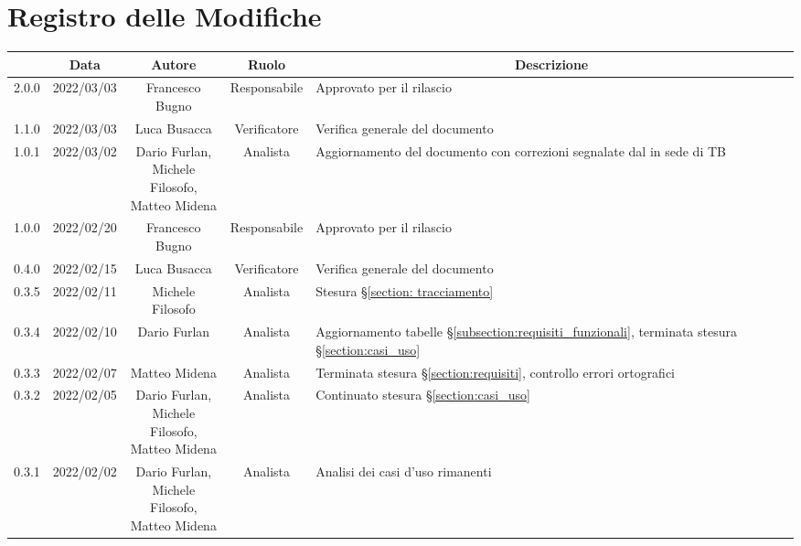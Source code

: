 \thispagestyle{empty}
\section*{Registro delle Modifiche}
\begin{center}
	\renewcommand{\arraystretch}{1.8}
	\begin{longtable}[c]{c | c | c | c | p{5cm}}
		\rowcolor[HTML]{125E28}
		\multicolumn{1}{c}{\color[HTML]{FFFFFF} \textbf{Versione}} &
		\multicolumn{1}{c}{\color[HTML]{FFFFFF} \textbf{Data}}     &
		\multicolumn{1}{c}{\color[HTML]{FFFFFF} \textbf{Autore}}   &
		\multicolumn{1}{c}{\color[HTML]{FFFFFF} \textbf{Ruolo}}    &
		\multicolumn{1}{c}{\color[HTML]{FFFFFF} \textbf{Descrizione}} \\
		\endhead
		2.0.0 & 2022/03/03 & Francesco Bugno & Responsabile & Approvato per il rilascio\\
		1.1.0 & 2022/03/03 & Luca Busacca & Verificatore & Verifica generale del documento\\
		1.0.1 & 2022/03/02 & \Shortunderstack{Dario Furlan,\\Michele Filosofo,\\Matteo Midena} & Analista & Aggiornamento del documento con correzioni segnalate dal \commitNameS{} in sede di TB \\
		1.0.0 & 2022/02/20 & Francesco Bugno & Responsabile & Approvato per il rilascio\\
		0.4.0 & 2022/02/15 & Luca Busacca & Verificatore & Verifica generale del documento\\
		0.3.5 & 2022/02/11 & Michele Filosofo & Analista & Stesura §\ref{section: tracciamento}\\
		0.3.4 & 2022/02/10 & Dario Furlan & Analista & Aggiornamento tabelle §\ref{subsection:requisiti_funzionali}, terminata stesura §\ref{section:casi_uso} \\
		0.3.3 & 2022/02/07 & Matteo Midena & Analista & Terminata stesura §\ref{section:requisiti}, controllo errori ortografici \\
		0.3.2 & 2022/02/05 & \Shortunderstack{Dario Furlan,\\Michele Filosofo,\\Matteo Midena\\} & Analista & Continuato stesura §\ref{section:casi_uso} \\
		0.3.1 & 2022/02/02 & \Shortunderstack{Dario Furlan,\\Michele Filosofo,\\Matteo Midena\\} & Analista & Analisi dei casi d'uso rimanenti \\

\end{longtable}
\end{center}
